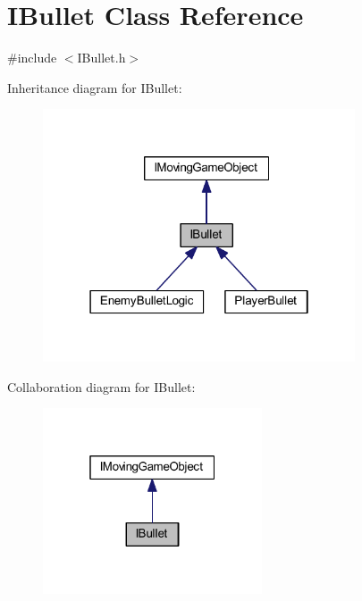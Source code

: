 \hypertarget{class_i_bullet}{}\section{I\+Bullet Class Reference}
\label{class_i_bullet}


{\ttfamily \#include $<$I\+Bullet.\+h$>$}



Inheritance diagram for I\+Bullet\+:\nopagebreak
\begin{figure}[H]
\begin{center}
\leavevmode
\includegraphics[width=262pt]{class_i_bullet__inherit__graph}
\end{center}
\end{figure}


Collaboration diagram for I\+Bullet\+:\nopagebreak
\begin{figure}[H]
\begin{center}
\leavevmode
\includegraphics[width=184pt]{class_i_bullet__coll__graph}
\end{center}
\end{figure}
